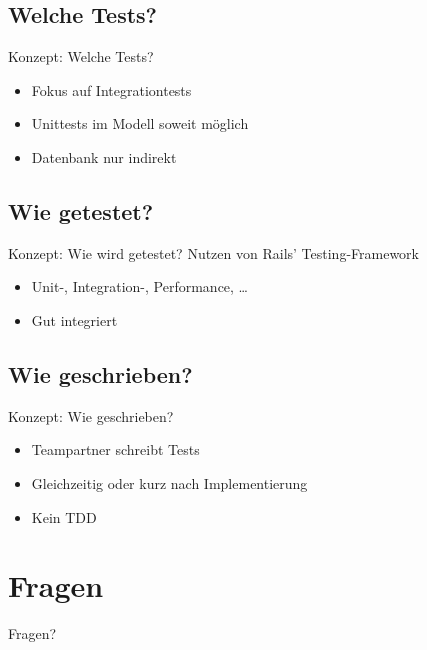\documentclass{beamer}
\begin{document}
\subsection{Welche Tests?}
\begin{frame}{Konzept: Welche Tests?}
  \begin{itemize}[<+->]
    \item Fokus auf Integrationtests
    \item Unittests im Modell soweit möglich
    \item Datenbank nur indirekt
  \end{itemize}
\end{frame}
\subsection{Wie getestet?}
\begin{frame}{Konzept: Wie wird getestet?}
    Nutzen von Rails' Testing-Framework
  \begin{itemize}
    \item Unit-, Integration-, Performance, \ldots
    \item Gut integriert
  \end{itemize}
\end{frame}
\subsection{Wie geschrieben?}
\begin{frame}{Konzept: Wie geschrieben?}
  \begin{itemize}
    \item Teampartner schreibt Tests
    \item Gleichzeitig oder kurz nach Implementierung
    \item Kein TDD
  \end{itemize}
\end{frame}
\section{Fragen}
\begin{frame}{Fragen?}
\end{frame}
\end{document}
